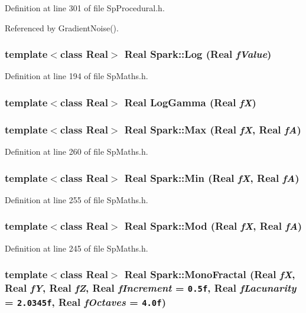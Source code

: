 Definition at line 301 of file Sp\-Procedural.h.

Referenced by Gradient\-Noise().
\subsubsection{\setlength{\rightskip}{0pt plus 5cm}template$<$class Real$>$ Real Spark::Log (Real {\em f\-Value})}\label{namespaceSpark_a46}


Definition at line 194 of file Sp\-Maths.h.
\subsubsection{\setlength{\rightskip}{0pt plus 5cm}template$<$class Real$>$ Real Log\-Gamma (Real {\em f\-X})}\label{namespaceSpark_a37}


\subsubsection{\setlength{\rightskip}{0pt plus 5cm}template$<$class Real$>$ Real Spark::Max (Real {\em f\-X}, Real {\em f\-A})}\label{namespaceSpark_a56}


Definition at line 260 of file Sp\-Maths.h.
\subsubsection{\setlength{\rightskip}{0pt plus 5cm}template$<$class Real$>$ Real Spark::Min (Real {\em f\-X}, Real {\em f\-A})}\label{namespaceSpark_a55}


Definition at line 255 of file Sp\-Maths.h.
\subsubsection{\setlength{\rightskip}{0pt plus 5cm}template$<$class Real$>$ Real Spark::Mod (Real {\em f\-X}, Real {\em f\-A})}\label{namespaceSpark_a57}


Definition at line 245 of file Sp\-Maths.h.
\subsubsection{\setlength{\rightskip}{0pt plus 5cm}template$<$class Real$>$ Real Spark::Mono\-Fractal (Real {\em f\-X}, Real {\em f\-Y}, Real {\em f\-Z}, Real {\em f\-Increment} = {\tt 0.5f}, Real {\em f\-Lacunarity} = {\tt 2.0345f}, Real {\em f\-Octaves} = {\tt 4.0f})}\label{namespaceSpark_a78}


